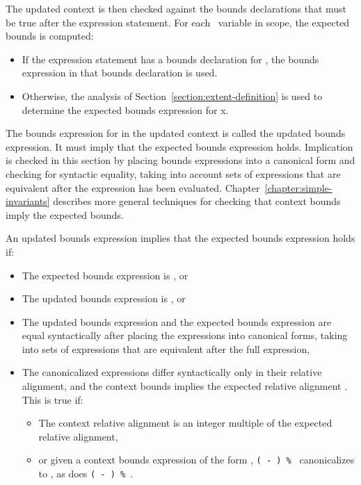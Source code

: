 The updated context is then checked against the bounds declarations that
must be true after the expression statement. For each
\arrayptr\ variable  in scope, the expected bounds is
computed:

\begin{itemize}
\item
  If the expression statement has a bounds declaration for , the
  bounds expression in that bounds declaration is used.
\item
  Otherwise, the analysis of Section~\ref{section:extent-definition}
  is used to determine the
  expected bounds expression for x.
\end{itemize}

The bounds expression for  in the updated context
is called the updated bounds expression.  It must imply that the
expected bounds expression holds. Implication is checked in this section
by placing bounds expressions into a canonical form and
checking for syntactic equality, taking into account sets 
of expressions that are equivalent after the expression has
been evaluated.  Chapter~\ref{chapter:simple-invariants}
describes more general techniques for checking
that context bounds imply the expected bounds.

An updated bounds expression implies that the expected bounds
expression holds if:

\begin{itemize}
\item
  The expected bounds expression is \boundsunknown, or
\item
  The updated bounds expression is \boundsany, or
\item
  The updated bounds expression and the expected bounds expression are
  equal syntactically after placing the expressions into canonical
  forms, taking into sets of expressions that are equivalent after the full
  expression,
\item
  The canonicalized expressions
  differ syntactically only in their relative alignment, and
  the context bounds implies the expected relative alignment .
  This is true if:

  \begin{itemize}
  \item
    The context relative alignment is an integer multiple of the
    expected relative alignment,
  \item
   or given a context bounds expression of the form
   ,
   \texttt{( - ) \% }
   canonicalizes to , as does
   \texttt{( - ) \% }.
  \end{itemize}
\end{itemize}


